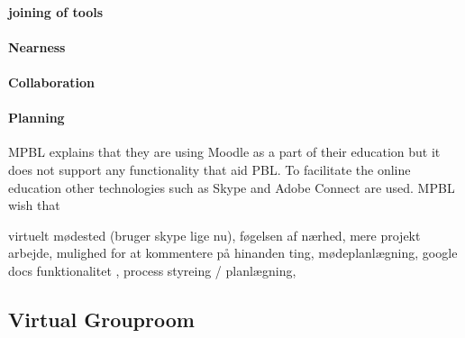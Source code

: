 \paragraph{joining of tools}

\paragraph{Nearness}
\paragraph{Collaboration}
\paragraph{Planning}




MPBL explains that they are using Moodle as a part of their education but it does not support any functionality that aid PBL. 
To facilitate the online education other technologies such as Skype\cite{skype} and Adobe Connect\cite{adobe} are used. MPBL wish that        

virtuelt mødested (bruger skype lige nu), føgelsen af nærhed, mere projekt arbejde, mulighed for at kommentere på hinanden ting, mødeplanlægning, google docs funktionalitet , process styreing / planlægning, 

\subsection{Virtual Grouproom}


\begin{comment}
In the preliminary phase of working with Electronic-learning (E-learning) it is important for us to ensure that we are in fact working with problems that are relevant in the E-learning and Problem Based Learning (PBL) fields of study, as we are aiming at improving the overall way that the chosen E-learning environment at Aalborg University (AAU), namely Moodle, supports PBL. 
Because AAU is renowned for its implementation of PBL, we do not have to look very far to find some of the leading experts in this field.
\end{comment}
\begin{comment}
To optian domain knowlage of how moodle and Aapbl works 
Domain knowlage
In the initial phase of this project we conducted two interviews with xxx from ELSA\cite{x} and yyy from MPBL. 

interviews
*ELSA
*MPBL

*Baseret på de ting de fortalte ->
*Kommunication
* 
*Fildeling

Opdeling i de 4 områder

*akritektur
\end{comment}

